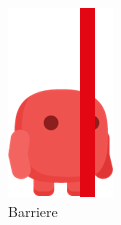 \begin{figure}[H]
    \centering
    \begin{subfigure}[H]{0.10\textwidth}
        \includegraphics[width=\textwidth]{img/realisierung/assets/barriere}
        \caption{Barriere}
        \label{fig:barriere}
    \end{subfigure}
    \qquad
    \begin{subfigure}[H]{0.15\textwidth}

\end{subfigure}
\end{figure}
